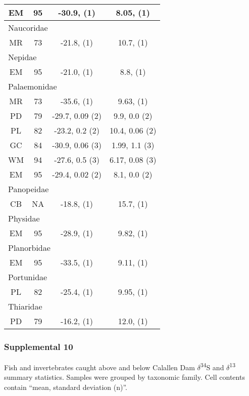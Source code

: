 \documentclass[
]{article}
\begin{document}
\begin{longtable}{cccc}
EM & 95 & -30.9,     (1) & 8.05,     (1) \\ 
\midrule
\multicolumn{4}{l}{Naucoridae} \\ 
\midrule
MR & 73 & -21.8,     (1) & 10.7,     (1) \\ 
\midrule
\multicolumn{4}{l}{Nepidae} \\ 
\midrule
EM & 95 & -21.0,     (1) & 8.8,     (1) \\ 
\midrule
\multicolumn{4}{l}{Palaemonidae} \\ 
\midrule
MR & 73 & -35.6,     (1) & 9.63,     (1) \\ 
PD & 79 & -29.7, 0.09 (2) & 9.9, 0.0 (2) \\ 
PL & 82 & -23.2, 0.2 (2) & 10.4, 0.06 (2) \\ 
GC & 84 & -30.9, 0.06 (3) & 1.99, 1.1 (3) \\ 
WM & 94 & -27.6, 0.5 (3) & 6.17, 0.08 (3) \\ 
EM & 95 & -29.4, 0.02 (2) & 8.1, 0.0 (2) \\ 
\midrule
\multicolumn{4}{l}{Panopeidae} \\ 
\midrule
CB & NA & -18.8,     (1) & 15.7,     (1) \\ 
\midrule
\multicolumn{4}{l}{Physidae} \\ 
\midrule
EM & 95 & -28.9,     (1) & 9.82,     (1) \\ 
\midrule
\multicolumn{4}{l}{Planorbidae} \\ 
\midrule
EM & 95 & -33.5,     (1) & 9.11,     (1) \\ 
\midrule
\multicolumn{4}{l}{Portunidae} \\ 
\midrule
PL & 82 & -25.4,     (1) & 9.95,     (1) \\ 
\midrule
\multicolumn{4}{l}{Thiaridae} \\ 
PD & 79 & -16.2,     (1) & 12.0,     (1) \\ 
\bottomrule
\end{longtable}

\newpage

\hypertarget{supplemental-10}{%
\subsubsection{Supplemental 10}\label{supplemental-10}}

Fish and invertebrates caught above and below Calallen Dam
\(\delta\)\textsuperscript{34}S and \(\delta\)\textsuperscript{13}
summary statistics. Samples were grouped by taxonomic family. Cell
contents contain ``mean, standard deviation (n)''.
\end{document}
